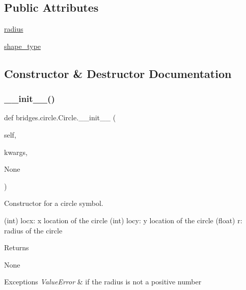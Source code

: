 \subsection*{Public Attributes}
\begin{DoxyCompactItemize}
\item 
\hyperlink{classbridges_1_1circle_1_1_circle_ab52ae32c28ea4175b815a7b04491205b}{radius}
\item 
\hyperlink{classbridges_1_1circle_1_1_circle_a34d318970485d12445ce43225b81428e}{shape\+\_\+type}
\end{DoxyCompactItemize}


\subsection{Constructor \& Destructor Documentation}
\mbox{\label{classbridges_1_1circle_1_1_circle_a04dfb68bb632534cf715e2ce927cc76a}} 
\subsubsection{\texorpdfstring{\+\_\+\+\_\+init\+\_\+\+\_\+()}{\_\_init\_\_()}}
{\footnotesize\ttfamily def bridges.\+circle.\+Circle.\+\_\+\+\_\+init\+\_\+\+\_\+ (\begin{DoxyParamCaption}\item[{}]{self,  }\item[{}]{kwargs,  }\item[{}]{None }\end{DoxyParamCaption})}



Constructor for a circle symbol. 

(int) locx\+: x location of the circle (int) locy\+: y location of the circle (float) r\+: radius of the circle \begin{DoxyReturn}{Returns}


None
\end{DoxyReturn}

\begin{DoxyExceptions}{Exceptions}
{\em Value\+Error} & if the radius is not a positive number \\
\hline
\end{DoxyExceptions}


